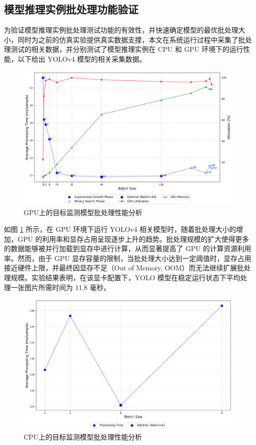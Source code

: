 \subsection{模型推理实例批处理功能验证}

为验证模型推理实例批处理测试功能的有效性，并快速确定模型的最优批处理大小，同时为之前的仿真实验提供真实数据支撑，本文在系统运行过程中采集了批处理测试的相关数据，并分别测试了模型推理实例在 CPU 和 GPU 环境下的运行性能，以下给出 YOLOv4 模型的相关采集数据。

\begin{figure}[ht]
  \centering
  \includegraphics[width=0.8\linewidth]{pics/expr/yolov3_gpu_performance.png}
  \caption{GPU上的目标监测模型批处理性能分析}
  \label{fig:expaigpu}
\end{figure}

如图 \ref{fig:expaigpu} 所示，在 GPU 环境下运行 YOLOv4 相关模型时，随着批处理大小的增加，GPU 的利用率和显存占用呈现逐步上升的趋势。批处理规模的扩大使得更多的数据能够被并行加载到显存中进行计算，从而显著提高了 GPU 的计算资源利用率。然而，由于 GPU 显存容量的限制，当批处理大小达到一定阈值时，显存占用接近硬件上限，并最终因显存不足（Out of Memory, OOM）而无法继续扩展批处理规模。实验结果表明，在该显卡配置下，YOLO 模型在稳定运行状态下平均处理一张图片所需时间为 11.8 毫秒。

\begin{figure}[ht]
  \centering
  \includegraphics[width=0.8\linewidth]{pics/expr/yolov3_cpu_performance.png}
  \caption{CPU上的目标监测模型批处理性能分析}
  \label{fig:expaicpu}
\end{figure}

